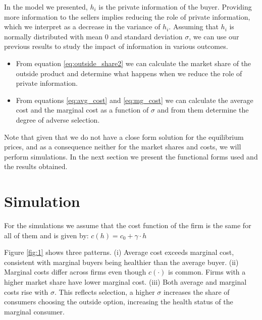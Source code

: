 \documentclass[12pt]{article}
\theoremstyle{plain}
\theoremstyle{plain}
\begin{document}
In the model we presented, $h_i$ is the private information of the buyer. Providing more information to the sellers implies reducing the role of private information, which we interpret as a decrease in the variance of $h_i$. Assuming that $h_i$ is normally distributed with mean $0$ and standard deviation $\sigma$, we can use our previous results to study the impact of information in various outcomes.

\begin{itemize}
    \item From equation \ref{eq:outside_share2} we can calculate the market share of the outside product and determine what happens when we reduce the role of private information. 

    \item From equations \ref{eq:avg_cost} and \ref{eq:mg_cost} we can calculate the average cost and the marginal cost as a function of $\sigma$ and from them determine the degree of adverse selection. 

\end{itemize}


Note that given that we do not have a close form solution for the equilibrium prices, and as a consequence neither for the market shares and costs, we will perform simulations. In the next section we present the functional forms used and the results obtained. 




\section{Simulation}\label{sec:simulation}

For the simulations we assume that the cost function of the firm is the same for all of them and is given by: 
$c(h) = c_0 + \gamma \cdot h$

Figure \ref{fig:1} shows three patterns. (i) Average cost exceeds marginal cost, consistent with marginal buyers being healthier than the average buyer. (ii) Marginal costs differ across firms even though  $c(\cdot)$ is common. Firms with a higher market share have lower marginal cost.  (iii) Both average and marginal costs rise with $\sigma$. This reflects selection, a higher $\sigma$ increases the share of consumers choosing the outside option, increasing the health status of the marginal consumer. 
\end{document}
